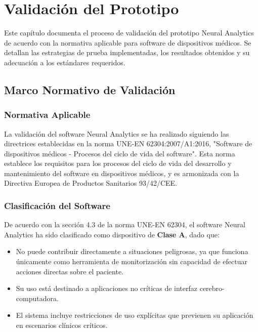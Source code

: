 \chapter{Validación del Prototipo}\label{ch:prototype_testing}

Este capítulo documenta el proceso de validación del prototipo Neural Analytics de acuerdo con la normativa aplicable para software de dispositivos médicos. Se detallan las estrategias de prueba implementadas, los resultados obtenidos y su adecuación a los estándares requeridos.

\section{Marco Normativo de Validación}

\subsection{Normativa Aplicable}

La validación del software Neural Analytics se ha realizado siguiendo las directrices establecidas en la norma UNE-EN 62304:2007/A1:2016, "Software de dispositivos médicos - Procesos del ciclo de vida del software". Esta norma establece los requisitos para los procesos del ciclo de vida del desarrollo y mantenimiento del software en dispositivos médicos, y es armonizada con la Directiva Europea de Productos Sanitarios 93/42/CEE.

\subsection{Clasificación del Software}

De acuerdo con la sección 4.3 de la norma UNE-EN 62304, el software Neural Analytics ha sido clasificado como dispositivo de \textbf{Clase A}, dado que:

\begin{itemize}
    \item No puede contribuir directamente a situaciones peligrosas, ya que funciona únicamente como herramienta de monitorización sin capacidad de efectuar acciones directas sobre el paciente.
    \item Su uso está destinado a aplicaciones no críticas de interfaz cerebro-computadora.
    \item El sistema incluye restricciones de uso explícitas que previenen su aplicación en escenarios clínicos críticos.
\end{itemize}

